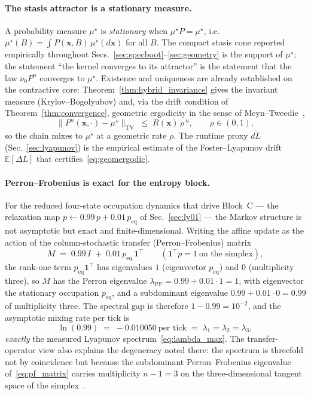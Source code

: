 \documentclass[11pt, a4paper]{article}
\newcommand{\E}{\mathbb{E}}
\newcommand{\sv}{\bm{x}}
\begin{document}
\paragraph{The stasis attractor is a stationary measure.}
A probability measure $\mu^\star$ is \emph{stationary} when
$\mu^\star P = \mu^\star$, i.e.\ $\mu^\star(B)=\int P(\sv,B)\,\mu^\star(d\sv)$ for
all $B$. The compact stasis cone reported empirically throughout
Secs.~\ref{sec:specboot}--\ref{sec:geometry} is the support of $\mu^\star$; the
statement ``the kernel converges to its attractor'' is the statement that the law
$\nu_0 P^n$ converges to $\mu^\star$. Existence and uniqueness are already
established on the contractive core: Theorem~\ref{thm:hybrid_invariance} gives the
invariant measure (Krylov--Bogolyubov) and, via the drift condition of
Theorem~\ref{thm:convergence}, geometric ergodicity in the sense of
Meyn--Tweedie~\cite{meyn2009markov},
\begin{equation}
  \bigl\lVert P^n(\sv,\cdot) - \mu^\star \bigr\rVert_{\mathrm{TV}}
    \;\le\; R(\sv)\,\rho^{\,n},
  \qquad \rho \in (0,1),
  \label{eq:geomergodic}
\end{equation}
so the chain mixes to $\mu^\star$ at a geometric rate $\rho$. The runtime proxy
$\overline{dL}$ (Sec.~\ref{sec:lyapunov}) is the empirical estimate of the
Foster--Lyapunov drift $\E[\Delta L]$ that certifies~\eqref{eq:geomergodic}.

\paragraph{Perron--Frobenius is exact for the entropy block.}
For the reduced four-state occupation dynamics that drive Block~C --- the
relaxation map $p \leftarrow 0.99\,p + 0.01\,p_\text{eq}$ of
Sec.~\ref{sec:ly01} --- the Markov structure is not asymptotic but exact and
finite-dimensional. Writing the affine update as the action of the column-stochastic
transfer (Perron--Frobenius) matrix
\begin{equation}
  M \;=\; 0.99\,I \;+\; 0.01\,p_\text{eq}\,\mathbf{1}^\top
  \qquad(\mathbf{1}^\top p = 1\ \text{on the simplex}),
  \label{eq:pf_matrix}
\end{equation}
the rank-one term $p_\text{eq}\mathbf{1}^\top$ has eigenvalues $1$ (eigenvector
$p_\text{eq}$) and $0$ (multiplicity three), so $M$ has the Perron eigenvalue
$\lambda_{\mathrm{PF}} = 0.99 + 0.01\cdot 1 = 1$, with eigenvector the stationary
occupation $p_\text{eq}$, and a subdominant eigenvalue
$0.99 + 0.01\cdot 0 = 0.99$ of multiplicity three. The spectral gap is therefore
$1 - 0.99 = 10^{-2}$, and the asymptotic mixing rate per tick is
\begin{equation}
  \ln(0.99) \;=\; -0.010050\ \text{per tick}
  \;=\; \lambda_1 = \lambda_2 = \lambda_3,
  \label{eq:pf_lyap}
\end{equation}
\emph{exactly} the measured Lyapunov spectrum~\eqref{eq:lambda_max}. The
transfer-operator view also explains the degeneracy noted there: the spectrum is
threefold not by coincidence but because the subdominant Perron--Frobenius
eigenvalue of~\eqref{eq:pf_matrix} carries multiplicity $n-1 = 3$ on the
three-dimensional tangent space of the simplex~\cite{lasotamackey1994chaos}.
\end{document}
